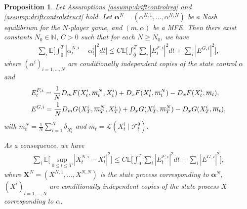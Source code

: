 \documentclass[11pt,reqno]{amsart}
\numberwithin{equation}{section}
\newtheorem{proposition}[theorem]{Proposition}
\theoremstyle{definition}
\def\E{{\mathbb E}}
\def\N{{\mathbb N}}
\newcommand{\bX}{\mathbf{X}}
\newcommand{\ov}{\overline}
\newcommand\cF{\mathcal F}
\newcommand\cL{\mathcal L}
\def \E{\mathbb{E}}
\def \N{\mathbb{N}}
\begin{document}
\begin{proposition} \label{prop:mainestdrift}
Let Assumptions \ref{assump:driftcontrolreg} and \ref{assump:driftcontrolstruct} hold. Let $\bm \alpha^N = (\alpha^{N,1},\dots,\alpha^{N,N})$ be a Nash equilibrium for the $N$-player game, and $(m,\alpha)$ be a MFE. Then there exist constants $N_0 \in \N$, $C  > 0$ such that for each $N \geq N_0$, we have 
\begin{align}
\label{eq:alpha.bound}
  \sum_{ i } \E\bigg[\int_0^T |\alpha^{N,i}_t - \alpha^i_t|^2 dt\bigg] \leq C \E \bigg[ \int_0^T  \sum_i |E_t^{F,i}|^2 dt +  \sum_i |E^{G,i}|^2 \bigg], 
\end{align}
where 
$(\alpha^i)_{i = 1,\dots,N}$ are conditionally independent copies of the state control $\alpha$  and\begin{align}
\label{eq:def.EF}
  &E_t^{F,i} = \frac{1}{N} D_m F(X_t^{i}, \ov{m}_t^N, X_t^i) + D_x F(X_t^i, \ov{m}_t^N) -  D_x F(X_t^i, \ov{m}_t),   \\
  \vspace{.1cm}
  \label{eq:def.EG}
  &E^{G,i} = \frac{1}{N} D_m G(X_T^{i},\ov{m}_T^N, X_T^i) +D_x G(X_T^i, \ov{m}_T^N) - D_x G(X_T^i, \ov{m}_t), 
\end{align}
with $\ov{m}_t^N = \frac{1}{N} \sum_{i = 1}^{N} \delta_{X_t^i}$ and $\ov{m}_t = \cL(X^i_t\mid \cF^0_t)$.

As a consequence, we have
\begin{align} \label{penbound}
  \sum_{ i} \E\Big[\sup_{0 \leq t \leq T} |X^{N,i}_t - X^i_t|^2 \Big] \leq C \E \bigg[ \int_0^T  \sum_i |E_t^{F,i}|^2 dt +  \sum_i |E^{G,i}|^2 \bigg], 
\end{align}
where 
$\bX^N = (X^{N,1},\dots,X^{N,N})$ is the state process corresponding to $\bm \alpha^N$, $(X^i)_{i = 1,\dots,N}$ are conditionally independent copies of the state process $X$ corresponding to $\alpha$.

\end{proposition}
\end{document}
